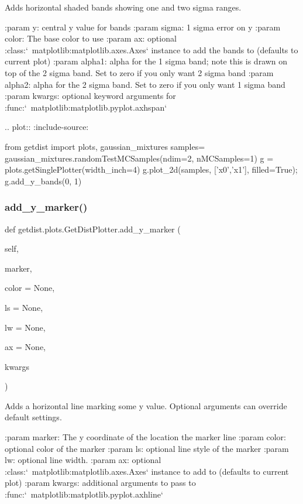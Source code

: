 \begin{DoxyVerb}Adds horizontal shaded bands showing one and two sigma ranges.

:param y: central y value for bands
:param sigma: 1 sigma error on y
:param color: The base color to use
:param ax: optional :class:`~matplotlib:matplotlib.axes.Axes` instance to add the bands to (defaults to current plot)
:param alpha1: alpha for the 1 sigma band; note this is drawn on top of the 2 sigma band. Set to zero if you only want 2 sigma band
:param alpha2: alpha for the 2 sigma band. Set to zero if you only want 1 sigma band
:param kwargs: optional keyword arguments for :func:`~matplotlib:matplotlib.pyplot.axhspan`

.. plot::
   :include-source:
   
    from getdist import plots, gaussian_mixtures
    samples= gaussian_mixtures.randomTestMCSamples(ndim=2, nMCSamples=1)
    g = plots.getSinglePlotter(width_inch=4)
    g.plot_2d(samples, ['x0','x1'], filled=True);
    g.add_y_bands(0, 1)
\end{DoxyVerb}
 \mbox{\label{classgetdist_1_1plots_1_1GetDistPlotter_a5839922c9cf43552f633678119f6f6de}} 
\subsubsection{\texorpdfstring{add\+\_\+y\+\_\+marker()}{add\_y\_marker()}}
{\footnotesize\ttfamily def getdist.\+plots.\+Get\+Dist\+Plotter.\+add\+\_\+y\+\_\+marker (\begin{DoxyParamCaption}\item[{}]{self,  }\item[{}]{marker,  }\item[{}]{color = {\ttfamily None},  }\item[{}]{ls = {\ttfamily None},  }\item[{}]{lw = {\ttfamily None},  }\item[{}]{ax = {\ttfamily None},  }\item[{}]{kwargs }\end{DoxyParamCaption})}

\begin{DoxyVerb}Adds a horizontal line marking some y value. Optional arguments can override default settings.

:param marker: The y coordinate of the location the marker line
:param color: optional color of the marker
:param ls: optional line style of the marker
:param lw: optional line width.
:param ax: optional :class:`~matplotlib:matplotlib.axes.Axes` instance to add to (defaults to current plot)
:param kwargs: additional arguments to pass to :func:`~matplotlib:matplotlib.pyplot.axhline`
\end{DoxyVerb}
 


